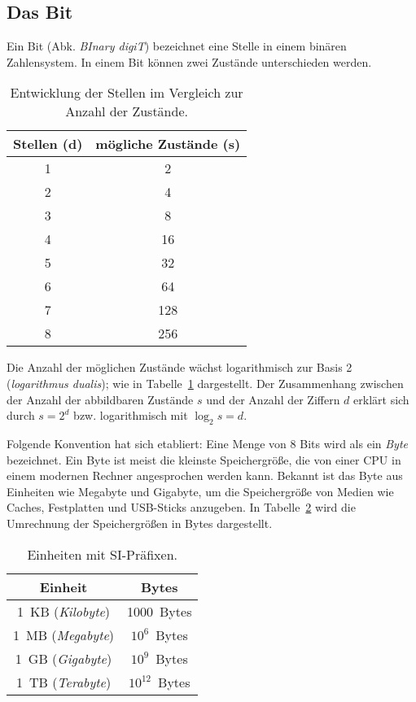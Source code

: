 \subsection{Das Bit}
%
Ein Bit (Abk. \emph{BInary digiT}) bezeichnet eine Stelle in einem
binären Zahlensystem. In einem Bit können zwei Zustände unterschieden werden.
%
\begin{table}[ht]
  \begin{center}
    \begin{tabular}{cc}
     \hline
      Stellen (d) & mögliche Zustände (s) \\
     \hline \hline
           1      &       2    \\
           2      &       4    \\
           3      &       8    \\
           4      &      16    \\
           5      &      32    \\
           6      &      64    \\
           7      &     128    \\
           8      &     256    \\
     \hline
    \end{tabular}
    \caption{Entwicklung der Stellen im Vergleich zur Anzahl der Zustände.}
    \label{tab:digits_states}
  \end{center}
\end{table}
%
Die Anzahl der möglichen Zustände wächst logarithmisch zur Basis 2
(\emph{logarithmus dualis}); wie in Tabelle~\ref{tab:digits_states}
dargestellt. Der Zusammenhang zwischen der Anzahl der abbildbaren
Zustände $s$ und der Anzahl der Ziffern $d$ erklärt sich durch
$s = 2^d$ bzw. logarithmisch mit $\log_2{s} = d$.

Folgende Konvention hat sich etabliert:
Eine Menge von 8 Bits wird als ein \emph{Byte} bezeichnet.
Ein Byte ist meist die kleinste Speichergröße, die
von einer CPU in einem modernen Rechner angesprochen werden kann.
Bekannt ist das Byte aus Einheiten wie Megabyte und Gigabyte, um
die Speichergröße von Medien wie Caches, Festplatten und USB-Sticks
anzugeben. In Tabelle~\ref{tab:si_units} wird die Umrechnung der
Speichergrößen in Bytes dargestellt.
%
\begin{table}[ht]
  \begin{center}
     \begin{tabular}{cc}
      \hline
       Einheit                 & Bytes \\
      \hline \hline
       1~KB (\emph{Kilobyte})  & 1000~Bytes \\
       1~MB (\emph{Megabyte})  & $10^6$~Bytes \\
       1~GB (\emph{Gigabyte})  & $10^9$~Bytes \\
       1~TB (\emph{Terabyte})  & $10^{12}$~Bytes \\
      \hline
     \end{tabular}
     \caption{Einheiten mit SI-Präfixen.}
     \label{tab:si_units}
  \end{center}
\end{table}

